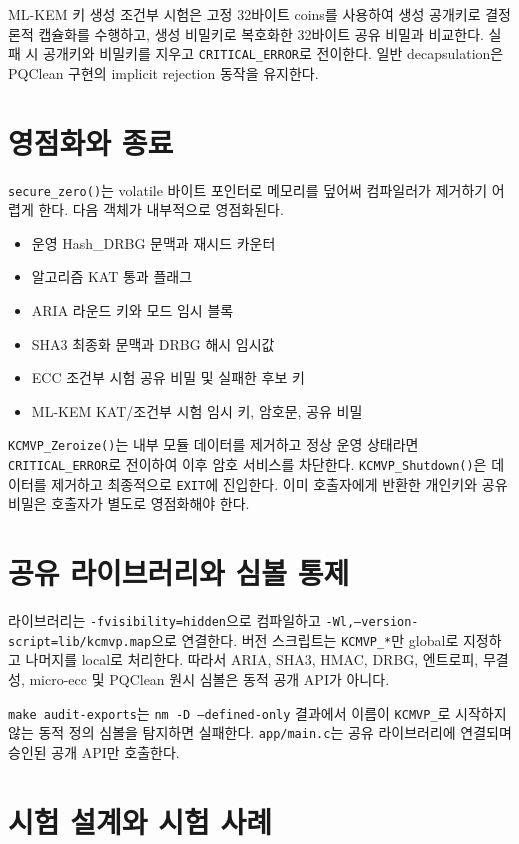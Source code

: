 \documentclass[11pt,a4paper]{article}
\begin{document}
ML-KEM 키 생성 조건부 시험은 고정 32바이트 coins를 사용하여 생성 공개키로
결정론적 캡슐화를 수행하고, 생성 비밀키로 복호화한 32바이트 공유 비밀과
비교한다. 실패 시 공개키와 비밀키를 지우고 \texttt{CRITICAL\_ERROR}로 전이한다.
일반 decapsulation은 PQClean 구현의 implicit rejection 동작을 유지한다.

\section{영점화와 종료}

\texttt{secure\_zero()}는 volatile 바이트 포인터로 메모리를 덮어써 컴파일러가
제거하기 어렵게 한다. 다음 객체가 내부적으로 영점화된다.

\begin{itemize}
  \item 운영 Hash\_DRBG 문맥과 재시드 카운터
  \item 알고리즘 KAT 통과 플래그
  \item ARIA 라운드 키와 모드 임시 블록
  \item SHA3 최종화 문맥과 DRBG 해시 임시값
  \item ECC 조건부 시험 공유 비밀 및 실패한 후보 키
  \item ML-KEM KAT/조건부 시험 임시 키, 암호문, 공유 비밀
\end{itemize}

\texttt{KCMVP\_Zeroize()}는 내부 모듈 데이터를 제거하고 정상 운영 상태라면
\texttt{CRITICAL\_ERROR}로 전이하여 이후 암호 서비스를 차단한다.
\texttt{KCMVP\_Shutdown()}은 데이터를 제거하고 최종적으로 \texttt{EXIT}에
진입한다. 이미 호출자에게 반환한 개인키와 공유 비밀은 호출자가 별도로
영점화해야 한다.

\section{공유 라이브러리와 심볼 통제}

라이브러리는 \texttt{-fvisibility=hidden}으로 컴파일하고
\texttt{-Wl,--version-script=lib/kcmvp.map}으로 연결한다. 버전 스크립트는
\texttt{KCMVP\_*}만 global로 지정하고 나머지를 local로 처리한다. 따라서 ARIA,
SHA3, HMAC, DRBG, 엔트로피, 무결성, micro-ecc 및 PQClean 원시 심볼은 동적
공개 API가 아니다.

\texttt{make audit-exports}는 \texttt{nm -D --defined-only} 결과에서 이름이
\texttt{KCMVP\_}로 시작하지 않는 동적 정의 심볼을 탐지하면 실패한다.
\texttt{app/main.c}는 공유 라이브러리에 연결되며 승인된 공개 API만 호출한다.

\section{시험 설계와 시험 사례}
\end{document}
